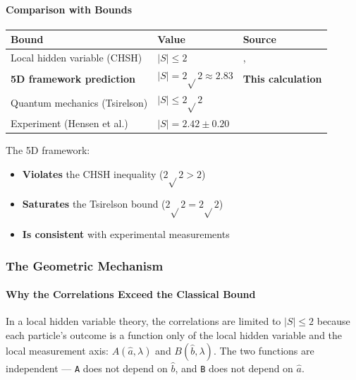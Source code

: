 \documentclass[aps,prd,preprint,superscriptaddress,longbibliography,floatfix]{revtex4-2}
\theoremstyle{remark}
\begin{document}
\paragraph{Comparison with Bounds}


\begin{table}[H]
\begin{ruledtabular}
\begin{tabular}{p{5.0cm}p{5.0cm}p{5.0cm}}
Bound & Value & Source \\
\hline
Local hidden variable (CHSH) & $\lvert S \rvert \leq 2$ & \cite{Bell1964}, \cite{CHSH1969} \\
\textbf{5D framework prediction} & \textbf{$\lvert S \rvert = 2\sqrt{}2 \approx 2.83$} & \textbf{This calculation} \\
Quantum mechanics (Tsirelson) & $\lvert S \rvert \leq 2\sqrt{}2$ & \cite{Tsirelson1980} \\
Experiment (Hensen et al.) & $\lvert S \rvert = 2.42 \pm 0.20$ & \cite{Hensenetal2015} \\
\end{tabular}
\end{ruledtabular}
\end{table}

The 5D framework:

\begin{itemize}
  \item \textbf{Violates} the CHSH inequality ($2\sqrt{}2 > 2$)
  \item \textbf{Saturates} the Tsirelson bound ($2\sqrt{}2 = 2\sqrt{}2$)
  \item \textbf{Is consistent} with experimental measurements
\end{itemize}


\subsubsection{The Geometric Mechanism}


\paragraph{Why the Correlations Exceed the Classical Bound}

In a local hidden variable theory, the correlations are limited to $|S| \leq 2$ because each particle's outcome is a function only of the local hidden variable and the local measurement axis: $A(\hat{a}, \lambda)$ and $B(\hat{b}, \lambda)$. The two functions are independent --- \texttt{A} does not depend on \texttt{$\hat{b}$}, and \texttt{B} does not depend on $\hat{a}$.
\end{document}
